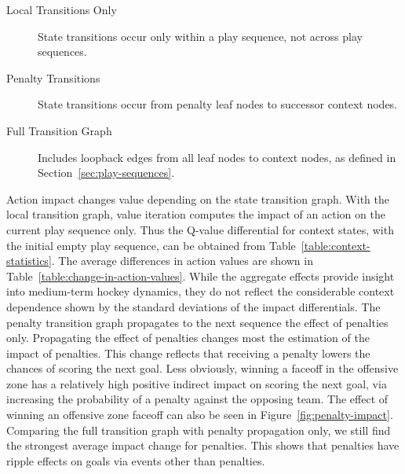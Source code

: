 \documentclass[]{article}
\begin{document}
\begin{description}
\item[Local Transitions Only]  State transitions occur only within a play sequence, not across play sequences.
\item[Penalty Transitions] State transitions occur from penalty leaf nodes to successor context nodes.
\item[Full Transition Graph] Includes loopback edges from all leaf nodes to context nodes, as defined in Section~\ref{sec:play-sequences}.
\end{description}

\begin{table}[htb]
\caption{Size of State Transition Graphs}
\label{table:size-of-graphs}
\begin{center}
\end{center}
\end{table}


Action impact changes value depending on the state transition graph. With the local transition graph, value iteration computes the impact of an action on the current play sequence only. Thus the Q-value differential for context states, with the initial empty play sequence, can be obtained from Table~\ref{table:context-statistics}. The average differences in action values
are shown in Table~\ref{table:change-in-action-values}. While the aggregate effects provide insight into medium-term hockey dynamics, they do not reflect the considerable context dependence shown by the standard deviations of the impact differentials. The penalty transition graph propagates to the next sequence the effect of penalties only. Propagating the effect of penalties changes most the estimation of the impact of penalties. This change reflects that receiving a penalty lowers the chances of scoring the next goal. Less obviously, winning a faceoff in the offensive zone has a relatively high positive indirect impact on scoring the next goal, via increasing the probability of a penalty against the opposing team. The effect of winning an offensive zone faceoff can also be seen in Figure~\ref{fig:penalty-impact}. Comparing the full transition graph with penalty propagation only, we still find the strongest average impact change for penalties. This shows that penalties have ripple effects on goals via events other than penalties.
\end{document}
